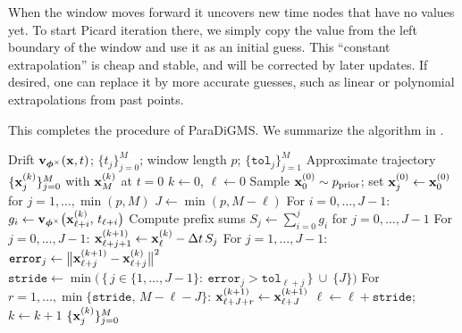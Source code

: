 When the window moves forward it uncovers new time nodes that
have no values yet. To start Picard iteration there, we simply copy the value
from the left boundary of the window and use it as an initial guess. This
``constant extrapolation'' is cheap and stable, and will be corrected by later
updates. If desired, one can replace it by more accurate guesses, such as linear
or polynomial extrapolations from past points.

This completes the procedure of ParaDiGMS. We summarize the algorithm in .


\begin{algorithm}[t]
  \caption{ParaDiGMS with Sliding Windows}
  \label{alg:paradigms}
  \begin{algorithmic}[1]
    \Require Drift ${\mathbf{v}}_{{\bm{\phi}}^\times}({\mathbf{x}},t)$; $\{t_j\}_{j=0}^{M}$; window length $p$; $\{\mathtt{tol}_j\}_{j=1}^{M}$
    \Ensure Approximate trajectory $\{{\mathbf{x}}^{(k)}_j\}_{j=0}^{M}$ with ${\mathbf{x}}^{(k)}_M$ at $t=0$
    \State $k \gets 0$, $\ell \gets 0$ 
    \State Sample ${\mathbf{x}}^{(0)}_0 \sim p_{\mathrm{prior}}$; set ${\mathbf{x}}^{(0)}_j \gets {\mathbf{x}}^{(0)}_0$ for $j=1,\ldots,\min(p,M)$  \Statex {}
      \State $J \gets \min(p,  M-\ell)$   
      \State {} 
      \State For $i=0,\ldots,J-1$: $g_i \gets {\mathbf{v}}_{{\bm{\phi}}^\times} \big({\mathbf{x}}^{(k)}_{\ell+i},\, t_{\ell+i}\big)$ 
      \Statex {}
      \State Compute prefix sums $S_j \gets \sum_{i=0}^{j} g_i$ for $j=0,\ldots,J-1$ 
      \Statex {}
      \State {} 
      \State For $j=0,\ldots,J-1$: $\displaystyle {\mathbf{x}}^{(k+1)}_{\ell+j+1} \gets {\mathbf{x}}^{(k)}_{\ell} - \Delta t\, S_j$ 
      \Statex {}
      \State {} 
      \State For $j=1,\ldots,J-1$: $\mathtt{error}_j \gets \big\|{\mathbf{x}}^{(k+1)}_{\ell+j}-{\mathbf{x}}^{(k)}_{\ell+j}\big\|^2$ \Statex {}
      \State $\displaystyle \mathtt{stride} \gets \min \Big(\,\{\,j\in\{1,\ldots,J-1\}:~\mathtt{error}_j>\mathtt{tol}_{\ell+j}\,\}\ \cup\ \{J\}\Big)$
      \State {} 
        \State For $r=1,\ldots,\min\{\mathtt{stride},\,M-\ell-J\}$:
        ${\mathbf{x}}^{(k+1)}_{\ell+J+r}
        \gets
        {\mathbf{x}}^{(k+1)}_{\ell+J}$ 
      \Statex {}
      \State $\ell \gets \ell + \mathtt{stride}$;\quad $k \gets k+1$
    \EndWhile
    \State \Return $\{{\mathbf{x}}^{(k)}_j\}_{j=0}^{M}$
  \end{algorithmic}
\end{algorithm}





